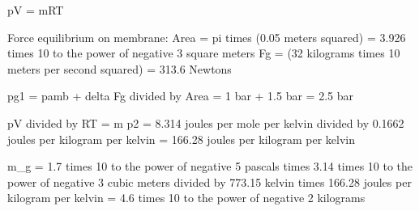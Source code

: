 pV = mRT  

Force equilibrium on membrane:  
Area = pi times (0.05 meters squared) = 3.926 times 10 to the power of negative 3 square meters  
Fg = (32 kilograms times 10 meters per second squared) = 313.6 Newtons  

pg1 = pamb + delta Fg divided by Area = 1 bar + 1.5 bar = 2.5 bar  

pV divided by RT = m  
p2 = 8.314 joules per mole per kelvin divided by 0.1662 joules per kilogram per kelvin = 166.28 joules per kilogram per kelvin  

m_g = 1.7 times 10 to the power of negative 5 pascals times 3.14 times 10 to the power of negative 3 cubic meters divided by 773.15 kelvin times 166.28 joules per kilogram per kelvin = 4.6 times 10 to the power of negative 2 kilograms